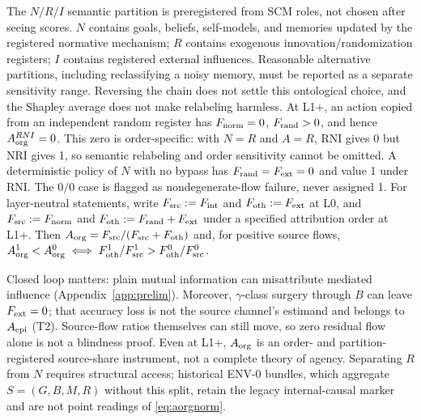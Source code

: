 The $N/R/I$ semantic partition is preregistered from SCM roles, not chosen
after seeing scores. $N$ contains goals, beliefs, self-models, and memories
updated by the registered normative mechanism; $R$ contains exogenous
innovation/randomization registers; $I$ contains registered external
influences. Reasonable alternative partitions, including reclassifying a noisy
memory, must be reported as a separate sensitivity range. Reversing the chain
does not settle this ontological choice, and the Shapley average does not make
relabeling harmless. At L1+, an action copied from an independent random
register has $F_{\mathrm{norm}}=0$, $F_{\mathrm{rand}}>0$, and hence $A_{\mathrm{org}}^{RNI}=0$. This zero is
order-specific: with $N=R$ and $A=R$, RNI gives 0 but NRI gives 1, so semantic
relabeling and order sensitivity cannot be omitted. A deterministic policy of
$N$ with no bypass has $F_{\mathrm{rand}}=F_{\mathrm{ext}}=0$ and value 1 under RNI. The $0/0$ case is
flagged as nondegenerate-flow failure, never assigned 1. For layer-neutral
statements, write $F_{\mathrm{src}}:=F_{\mathrm{int}}$ and $F_{\mathrm{oth}}:=F_{\mathrm{ext}}$ at L0, and
$F_{\mathrm{src}}:=F_{\mathrm{norm}}$ and $F_{\mathrm{oth}}:=F_{\mathrm{rand}}+F_{\mathrm{ext}}$ under a specified attribution order
at L1+. Then $A_{\mathrm{org}}=F_{\mathrm{src}}/(F_{\mathrm{src}}+F_{\mathrm{oth}})$ and, for positive source flows,
$A_{\mathrm{org}}^1<A_{\mathrm{org}}^0\iff F_{\mathrm{oth}}^1/F_{\mathrm{src}}^1>F_{\mathrm{oth}}^0/F_{\mathrm{src}}^0$.

Closed loop matters: plain mutual information can misattribute mediated
influence (Appendix~\ref{app:prelim}). Moreover, $\gamma$-class surgery through
$B$ can leave $F_{\mathrm{ext}}=0$; that accuracy loss is not the source channel's
estimand and belongs to $A_{\mathrm{epi}}$ (T2). Source-flow ratios themselves can still
move, so zero residual flow alone is not a blindness proof. Even at L1+,
$A_{\mathrm{org}}$ is an order- and partition-registered source-share instrument, not a
complete theory of agency. Separating $R$ from
$N$ requires structural access; historical ENV-0 bundles, which aggregate
$S=(G,B,M,R)$ without this split, retain the legacy internal-causal marker and
are not point readings of \eqref{eq:aorgnorm}.

